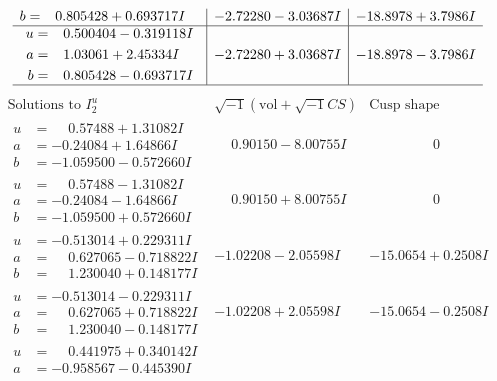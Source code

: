 \documentclass[1p]{elsarticle_modified}
\theoremstyle{definition}
\newcommand{\I}{\sqrt{-1}}
\begin{document}
$$\begin{array}{c|c|c}
\begin{aligned}
b &= \phantom{-}0.805428 + 0.693717 I\end{aligned}
 & -2.72280 - 3.03687 I & -18.8978 + 3.7986 I \\ \hline\begin{aligned}
u &= \phantom{-}0.500404 - 0.319118 I \\
a &= \phantom{-}1.03061 + 2.45334 I \\
b &= \phantom{-}0.805428 - 0.693717 I\end{aligned}
 & -2.72280 + 3.03687 I & -18.8978 - 3.7986 I\\
 \hline 
 \end{array}$$\newpage$$\begin{array}{c|c|c}  
\text{Solutions to }I^u_{2}& \I (\text{vol} + \sqrt{-1}CS) & \text{Cusp shape}\\
 \hline 
\begin{aligned}
u &= \phantom{-}0.57488 + 1.31082 I \\
a &= -0.24084 + 1.64866 I \\
b &= -1.059500 - 0.572660 I\end{aligned}
 & \phantom{-}0.90150 - 8.00755 I & \phantom{-0.000000 } 0 \\ \hline\begin{aligned}
u &= \phantom{-}0.57488 - 1.31082 I \\
a &= -0.24084 - 1.64866 I \\
b &= -1.059500 + 0.572660 I\end{aligned}
 & \phantom{-}0.90150 + 8.00755 I & \phantom{-0.000000 } 0 \\ \hline\begin{aligned}
u &= -0.513014 + 0.229311 I \\
a &= \phantom{-}0.627065 - 0.718822 I \\
b &= \phantom{-}1.230040 + 0.148177 I\end{aligned}
 & -1.02208 - 2.05598 I & -15.0654 + 0.2508 I \\ \hline\begin{aligned}
u &= -0.513014 - 0.229311 I \\
a &= \phantom{-}0.627065 + 0.718822 I \\
b &= \phantom{-}1.230040 - 0.148177 I\end{aligned}
 & -1.02208 + 2.05598 I & -15.0654 - 0.2508 I \\ \hline\begin{aligned}
u &= \phantom{-}0.441975 + 0.340142 I \\
a &= -0.958567 - 0.445390 I \\

\end{aligned}
\end{array}$$
\end{document}
